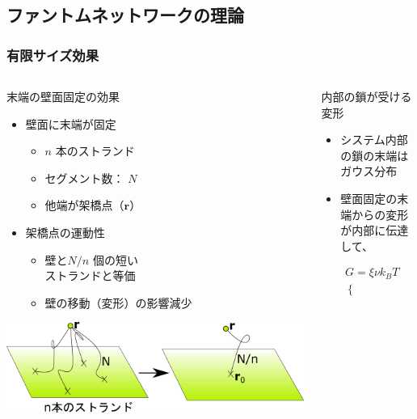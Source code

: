\documentclass[12pt, dvipdfmx]{beamer}
\begin{document}
\subsection{ファントムネットワークの理論}
\begin{frame}
	\frametitle{有限サイズ効果}
		\begin{columns}[totalwidth=1\textwidth]
				\begin{block}{末端の壁面固定の効果}
				\begin{itemize}
					\item 壁面に末端が固定
						\begin{itemize}
							\item $n$ 本のストランド
							\item セグメント数： $N$
							\item 他端が架橋点（$\bm{r}$）
						\end{itemize}
					\item 架橋点の運動性
						\begin{itemize}
							\item 壁と$N/n$ 個の短い\\ストランドと等価
							\item 壁の移動（変形）の影響減少
						\end{itemize}
				\end{itemize}
				\begin{center}
					\includegraphics[width=.8\textwidth]{phantom-1.png}
				\end{center}
				\end{block}
				\begin{exampleblock}{内部の鎖が受ける変形}
					\begin{itemize}
						\item システム内部の鎖の末端はガウス分布
						\item 壁面固定の末端からの変形が内部に伝達して、
					\end{itemize}
					\tiny
					\begin{align*}
						&G=\xi \nu k_BT \\
							&\begin{cases}

\end{cases}
\end{align*}
\end{exampleblock}
\end{columns}
\end{frame}
\end{document}
